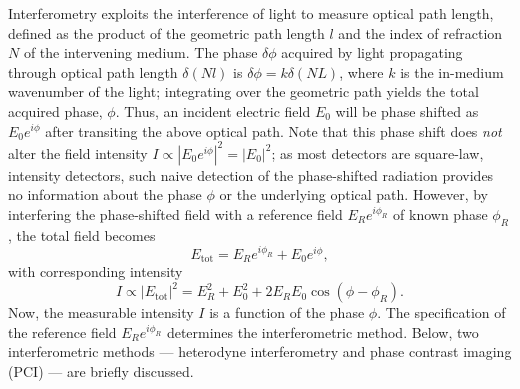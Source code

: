 Interferometry exploits the interference of light
to measure optical path length, defined as the product of
the geometric path length $l$ and
the index of refraction $N$ of the intervening medium.
The phase $\delta \phi$ acquired by light propagating through
optical path length $\delta(Nl)$ is
$\delta\phi = k \delta(NL)$, where
$k$ is the in-medium wavenumber of the light;
integrating over the geometric path
yields the total acquired phase, $\phi$.
Thus, an incident electric field $E_0$
will be phase shifted as $E_0 e^{i \phi}$
after transiting the above optical path.
Note that this phase shift does \emph{not} alter
the field intensity $I \propto |E_0 e^{i \phi}|^2 = |E_0|^2$;
as most detectors are square-law, intensity detectors,
such naive detection of the phase-shifted radiation
provides no information about the phase $\phi$
or the underlying optical path.
However, by interfering the phase-shifted field with
a reference field $E_R e^{i \phi_R}$ of known phase $\phi_R$,
the total field becomes
\begin{equation}
  E_{\text{tot}} = E_R e^{i \phi_R} + E_0 e^{i \phi},
  \label{eq:Introduction:OpticalInterferometry:generic_interferometer_electric_field}
\end{equation}
with corresponding intensity
\begin{equation}
  I
  \propto
  |E_{\text{tot}}|^2
  =
  E_R^2 + E_0^2 + 2 E_R E_0 \cos(\phi - \phi_R).
  \label{eq:Introduction:OpticalInterferometry:generic_interferometer_intensity}
\end{equation}
Now, the measurable intensity $I$
is a function of the phase $\phi$.
The specification of the reference field $E_R e^{i \phi_R}$
determines the interferometric method.
Below, two interferometric methods ---
heterodyne interferometry and phase contrast imaging (PCI) ---
are briefly discussed.


